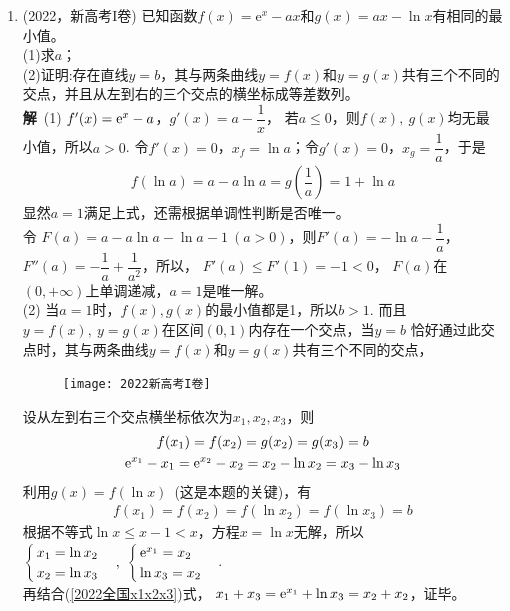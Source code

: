 \begin{enumerate}[label={【\textbf{例\thechapter.\arabic*}】},
 leftmargin=\inteval{\myenumleftmargin}pt,
 itemsep=\inteval{\myenumitempsep}pt,
 itemindent=\inteval{\myenumitemindent}pt]
\item \label{2022新高考I卷导数x1x2x3}(2022，新高考I卷)
已知函数$f(x)=\mathrm{e}^{x}-ax$和$g(x)=ax-\ln x$有相同的最小值。\\
(1)求$a$；\\
(2)证明:存在直线$y=b$，其与两条曲线$y=f(x)$和$y=g(x)$共有三个不同的交点，并且从左到右的三个交点的横坐标成等差数列。\\
\textbf{解}\ (1) $ f'(x)=\mathrm{e}^x-a $，$ g'(x)=a-\dfrac{1}{x} $，
若$ a\leq 0 $，则$ f(x),\ g(x) $均无最小值，所以$ a>0 $.
令$ f'(x)=0 $，$ x_f=\ln a $；令$ g'(x)=0 $，$ x_g=\dfrac{1}{a} $，于是
\begin{gather*}
    f(\ln a)=a-a\ln a=g\left(\dfrac{1}{a}\right)=1+\ln a
\end{gather*}
显然$ a=1 $满足上式，还需根据单调性判断是否唯一。\\ 令
$ F(a)=a-a\ln a-\ln a-1\ (a>0) $，则$ F'(a)=-\ln a-\dfrac{1}{a} $，
$ F''(a)=-\dfrac{1}{a}+\dfrac{1}{a^2} $，所以，
$ F'(a)\leq F'(1)=-1<0 $，
$ F(a) $在$ (0,+\infty) $上单调递减，$ a=1 $是唯一解。\\
(2) 当$ a=1 $时，$ f(x),g(x) $的最小值都是1，所以$ b>1 $.
而且$ y=f(x),\ y=g(x) $在区间$ (0,1) $内存在一个交点，当$ y=b $
恰好通过此交点时，其与两条曲线$y=f(x)$和$y=g(x)$共有三个不同的交点，
\begin{figure}[!ht]
    \centering
    \texttt{[image: 2022新高考I卷]}
\end{figure}
\noindent 设从左到右三个交点横坐标依次为$ x_1,x_2,x_3 $，则
\begin{gather}
    f(x_1)=f(x_2)=g(x_2)=g(x_3)=b \nonumber \\
    \mathrm{e}^{x_1}-x_1=\mathrm{e}^{x_2}-x_2=x_2-\ln x_2=x_3-\ln x_3 
    \label{2022全国x1x2x3}
\end{gather}
利用$ g(x)=f(\ln x) $\ (这是本题的关键)，有
\begin{gather*}
    f(x_1)=f(x_2)=f(\ln x_2)=f(\ln x_3)=b
\end{gather*}
根据不等式$ \ln x\leq x-1<x $，方程$ x=\ln x $无解，所以
$ \begin{cases}
    x_1=\ln x_2 \\
    x_2=\ln x_3
\end{cases},\ 
\begin{cases}
    \e^{x_1}=x_2 \\
    \ln x_3=x_2
\end{cases}$. \\再结合(\ref{2022全国x1x2x3})式，
$ x_1+x_3=\mathrm{e}^{x_1}+\ln x_3=x_2+x_2 $，证毕。


\end{enumerate}
